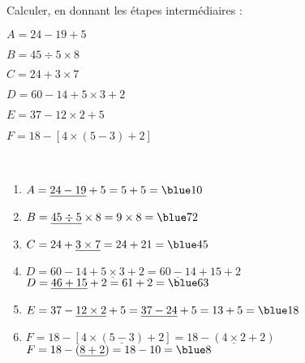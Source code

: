 \begin{exercice} %
   Calculer, en donnant les étapes intermédiaires :
     \begin{list}{}{}
        \item $A=24-19+5$
        \item $B=45\div5\times8$
        \item $C=24+3\times7$        
        \item $D=60-14+5\times3+2$
        \item $E=37-12\times2+5$
        \item $F=18-[4\times(5-3)+2]$
      \end{list}
  \end{exercice}
  
  \begin{corrige}
     \ \\ [-5mm]
     \begin{enumerate}
        \item $A=\underline{24-19}+5 =5+5 =\blue 10$ \smallskip
        \item $B=\underline{45\div5}\times8 =9\times8 =\blue 72$ \smallskip
        \item $C=24+\underline{3\times7} =24+21 =\blue 45$ \smallskip
        \item $D=60-14+\underline{5\times3}+2 =\underline{60-14}+15+2$ \\
           $D=\underline{46+15}+2 =61+2 =\blue 63$ \smallskip
        \item $E=37-\underline{12\times2}+5 =\underline{37-24}+5 =13+5 =\blue 18$ \smallskip
        \item $F=18-[4\times(\underline{5-3})+2] =18-(\underline{4\times2}+2)$ \\
           $F=18-(\underline{8+2}) =18-10 =\blue 8$
     \end{enumerate}
  \end{corrige}